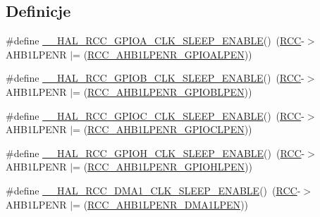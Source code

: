 \subsection*{Definicje}
\begin{DoxyCompactItemize}
\item 
\#define \hyperlink{group___r_c_c___a_h_b1___low_power___enable___disable_gaff8820b47bd3764e7cded76b9368460b}{\+\_\+\+\_\+\+H\+A\+L\+\_\+\+R\+C\+C\+\_\+\+G\+P\+I\+O\+A\+\_\+\+C\+L\+K\+\_\+\+S\+L\+E\+E\+P\+\_\+\+E\+N\+A\+B\+LE}()~(\hyperlink{group___peripheral__declaration_ga74944438a086975793d26ae48d5882d4}{R\+CC}-\/$>$A\+H\+B1\+L\+P\+E\+NR $\vert$= (\hyperlink{group___peripheral___registers___bits___definition_gaf1076b0644c026ab480efdb6aa8c74fb}{R\+C\+C\+\_\+\+A\+H\+B1\+L\+P\+E\+N\+R\+\_\+\+G\+P\+I\+O\+A\+L\+P\+EN}))
\item 
\#define \hyperlink{group___r_c_c___a_h_b1___low_power___enable___disable_ga0e718efc965ab07752cd865c3f33551a}{\+\_\+\+\_\+\+H\+A\+L\+\_\+\+R\+C\+C\+\_\+\+G\+P\+I\+O\+B\+\_\+\+C\+L\+K\+\_\+\+S\+L\+E\+E\+P\+\_\+\+E\+N\+A\+B\+LE}()~(\hyperlink{group___peripheral__declaration_ga74944438a086975793d26ae48d5882d4}{R\+CC}-\/$>$A\+H\+B1\+L\+P\+E\+NR $\vert$= (\hyperlink{group___peripheral___registers___bits___definition_ga55f6ff35a37c4b9106c9e8aa18ab4545}{R\+C\+C\+\_\+\+A\+H\+B1\+L\+P\+E\+N\+R\+\_\+\+G\+P\+I\+O\+B\+L\+P\+EN}))
\item 
\#define \hyperlink{group___r_c_c___a_h_b1___low_power___enable___disable_gac62505cc695d985fcf18ca1fd2f1a421}{\+\_\+\+\_\+\+H\+A\+L\+\_\+\+R\+C\+C\+\_\+\+G\+P\+I\+O\+C\+\_\+\+C\+L\+K\+\_\+\+S\+L\+E\+E\+P\+\_\+\+E\+N\+A\+B\+LE}()~(\hyperlink{group___peripheral__declaration_ga74944438a086975793d26ae48d5882d4}{R\+CC}-\/$>$A\+H\+B1\+L\+P\+E\+NR $\vert$= (\hyperlink{group___peripheral___registers___bits___definition_gac86ad592684edae0ba2cafd22a4f04d1}{R\+C\+C\+\_\+\+A\+H\+B1\+L\+P\+E\+N\+R\+\_\+\+G\+P\+I\+O\+C\+L\+P\+EN}))
\item 
\#define \hyperlink{group___r_c_c___a_h_b1___low_power___enable___disable_ga3e9419b44e83ed1e6951801c390a69ad}{\+\_\+\+\_\+\+H\+A\+L\+\_\+\+R\+C\+C\+\_\+\+G\+P\+I\+O\+H\+\_\+\+C\+L\+K\+\_\+\+S\+L\+E\+E\+P\+\_\+\+E\+N\+A\+B\+LE}()~(\hyperlink{group___peripheral__declaration_ga74944438a086975793d26ae48d5882d4}{R\+CC}-\/$>$A\+H\+B1\+L\+P\+E\+NR $\vert$= (\hyperlink{group___peripheral___registers___bits___definition_ga197be77b89e9eae127a536bd2601ded9}{R\+C\+C\+\_\+\+A\+H\+B1\+L\+P\+E\+N\+R\+\_\+\+G\+P\+I\+O\+H\+L\+P\+EN}))
\item 
\#define \hyperlink{group___r_c_c___a_h_b1___low_power___enable___disable_ga568e4d004285fe009bc4e5d33e13af61}{\+\_\+\+\_\+\+H\+A\+L\+\_\+\+R\+C\+C\+\_\+\+D\+M\+A1\+\_\+\+C\+L\+K\+\_\+\+S\+L\+E\+E\+P\+\_\+\+E\+N\+A\+B\+LE}()~(\hyperlink{group___peripheral__declaration_ga74944438a086975793d26ae48d5882d4}{R\+CC}-\/$>$A\+H\+B1\+L\+P\+E\+NR $\vert$= (\hyperlink{group___peripheral___registers___bits___definition_ga7d6c8ae1441d545d18c54b30c6a0da77}{R\+C\+C\+\_\+\+A\+H\+B1\+L\+P\+E\+N\+R\+\_\+\+D\+M\+A1\+L\+P\+EN}))

\end{DoxyCompactItemize}
